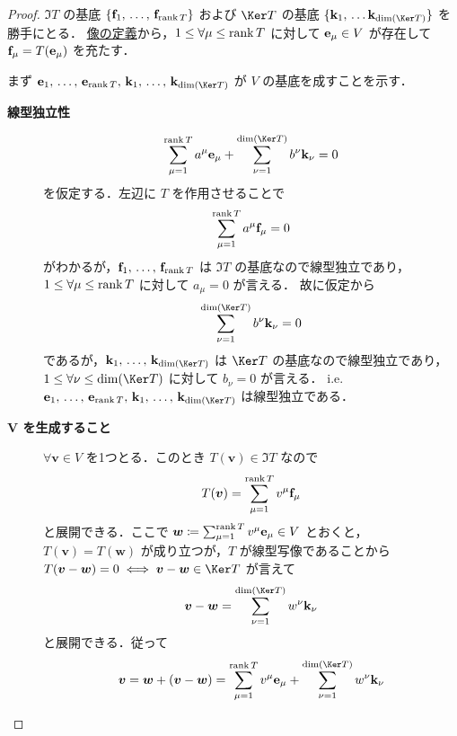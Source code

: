\documentclass[geometry_main]{subfiles}
\begin{document}
\begin{proof}
	$\Im T$ の基底 $\{\vb{f}_1,\, \dots,\, \vb{f}_{\rank T}\}$ および $\Ker T$ の基底 $\{\vb{k}_1,\, \dots \vb{k}_{\dim (\Ker T)}\}$ を勝手にとる．
	\hyperref[def:ker-module]{像の定義}から，$1 \le \forall \mu \le \rank T$ に対して $\vb{e}_\mu \in V$ が存在して $\vb{f}_\mu = T(\vb{e}_\mu)$ を充たす．
	
	まず $\vb{e}_1,\, \dots ,\, \vb{e}_{\rank T},\, \vb{k}_1,\, \dots,\, \vb{k}_{\dim (\Ker T)}$ が $V$ の基底を成すことを示す．
	\begin{description}
		\item[\textbf{線型独立性}] 
		\begin{align}
			\sum_{\mu = 1}^{\rank T} a^\mu \vb{e}_\mu + \sum_{\nu = 1}^{\dim (\Ker T)} b^\nu \vb{k}_\nu = 0
		\end{align}
		を仮定する．左辺に $T$ を作用させることで
		\begin{align}
			\sum_{\mu = 1}^{\rank T} a^\mu \vb{f}_\mu = 0
		\end{align}
		がわかるが，$\vb{f}_1,\, \dots,\, \vb{f}_{\rank T}$ は $\Im T$ の基底なので線型独立であり，$1 \le \forall \mu \le \rank T$ に対して $a_\mu = 0$ が言える．
		故に仮定から
		\begin{align}
			\sum_{\nu = 1}^{\dim (\Ker T)} b^\nu \vb{k}_\nu = 0
		\end{align}
		であるが，$\vb{k}_1,\, \dots,\, \vb{k}_{\dim (\Ker T)}$ は $\Ker T$ の基底なので線型独立であり，$1 \le \forall \nu \le \dim (\Ker T)$ に対して $b_\nu = 0$ が言える．
		i.e. $\vb{e}_1,\, \dots ,\, \vb{e}_{\rank T},\, \vb{k}_1,\, \dots,\, \vb{k}_{\dim (\Ker T)}$ は線型独立である．
		\item[\textbf{$\bm{V}$ を生成すること}] 
		$\forall \bm{v} \in V$ を1つとる．このとき $T(\bm{v}) \in \Im T$ なので
		\begin{align}
			T(\bm{v}) = \sum_{\mu = 1}^{\rank T} v^\mu \vb{f}_\mu
		\end{align}
		と展開できる．ここで
		$\bm{w} \coloneqq \sum_{\mu=1}^{\rank T} v^\mu \vb{e}_\mu \in V$ 
		とおくと，$T(\bm{v}) = T(\bm{w})$ が成り立つが，$T$ が線型写像であることから $T(\bm{v} - \bm{w}) = 0 \iff \bm{v} - \bm{w} \in \Ker T$ が言えて
		\begin{align}
			\bm{v} - \bm{w} = \sum_{\nu = 1}^{\dim (\Ker T)} w^\nu \vb{k}_\nu
		\end{align}
		と展開できる．従って
		\begin{align}
			\bm{v} = \bm{w} + (\bm{v} - \bm{w})
			= \sum_{\mu=1}^{\rank T} v^\mu \vb{e}_\mu + \sum_{\nu = 1}^{\dim (\Ker T)} w^\nu \vb{k}_\nu

\end{align}
\end{description}
\end{proof}
\end{document}
